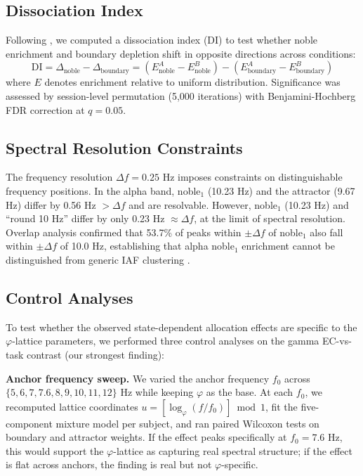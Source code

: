 \documentclass[11pt,a4paper]{article}
\newcommand{\phisym}{\varphi}
\newcommand{\fzero}{f_0}
\begin{document}
\subsection{Dissociation Index}
\label{sec:dissociation}

Following \textcite{lacy2026golden}, we computed a dissociation index (DI) to test whether noble enrichment and boundary depletion shift in opposite directions across conditions:
\begin{equation}
    \text{DI} = \Delta_{\text{noble}} - \Delta_{\text{boundary}} = (E_{\text{noble}}^A - E_{\text{noble}}^B) - (E_{\text{boundary}}^A - E_{\text{boundary}}^B)
\end{equation}
where $E$ denotes enrichment relative to uniform distribution. Significance was assessed by session-level permutation (5,000 iterations) with Benjamini-Hochberg FDR correction \parencite{benjamini1995fdr} at $q = 0.05$.

\subsection{Spectral Resolution Constraints}
\label{sec:resolution}

The frequency resolution $\Delta f = 0.25$ Hz imposes constraints on distinguishable frequency positions. In the alpha band, noble$_1$ (10.23 Hz) and the attractor (9.67 Hz) differ by 0.56 Hz $> \Delta f$ and are resolvable. However, noble$_1$ (10.23 Hz) and ``round 10 Hz'' differ by only 0.23 Hz $\approx \Delta f$, at the limit of spectral resolution. Overlap analysis confirmed that 53.7\% of peaks within $\pm\Delta f$ of noble$_1$ also fall within $\pm\Delta f$ of 10.0 Hz, establishing that alpha noble$_1$ enrichment cannot be distinguished from generic IAF clustering \parencite{klimesch1999eeg, grandy2013iaf}.

\subsection{Control Analyses}
\label{sec:controls}

To test whether the observed state-dependent allocation effects are specific to the $\phisym$-lattice parameters, we performed three control analyses on the gamma EC-vs-task contrast (our strongest finding):

\textbf{Anchor frequency sweep.} We varied the anchor frequency $\fzero$ across $\{5, 6, 7, 7.6, 8, 9, 10, 11, 12\}$ Hz while keeping $\phisym$ as the base. At each $\fzero$, we recomputed lattice coordinates $u = [\log_\phisym(f/\fzero)] \bmod 1$, fit the five-component mixture model per subject, and ran paired Wilcoxon tests on boundary and attractor weights. If the effect peaks specifically at $\fzero = 7.6$ Hz, this would support the $\phisym$-lattice as capturing real spectral structure; if the effect is flat across anchors, the finding is real but not $\phisym$-specific.
\end{document}
